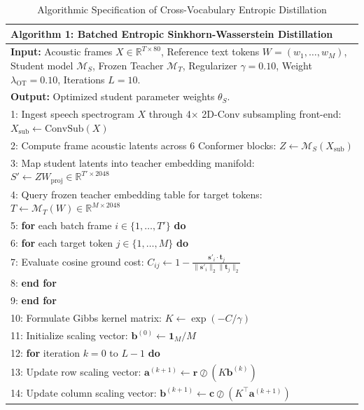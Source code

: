 \begin{table}[htbp]
\centering
\caption{Algorithmic Specification of Cross-Vocabulary Entropic Distillation}
\label{alg:sinkhorn_distill}
\begin{tabular}{p{14.5cm}}
\toprule
\textbf{Algorithm 1: Batched Entropic Sinkhorn-Wasserstein Distillation} \\
\midrule
\textbf{Input:} Acoustic frames $X \in \mathbb{R}^{T \times 80}$, Reference text tokens $W = (w_1, \dots, w_M)$, Student model $\mathcal{M}_S$, Frozen Teacher $\mathcal{M}_T$, Regularizer $\gamma = 0.10$, Weight $\lambda_{\text{OT}} = 0.10$, Iterations $L = 10$. \\
\textbf{Output:} Optimized student parameter weights $\theta_S$. \\
\midrule
1: Ingest speech spectrogram $X$ through 4$\times$ 2D-Conv subsampling front-end: $X_{\text{sub}} \leftarrow \text{ConvSub}(X)$ \\
2: Compute frame acoustic latents across 6 Conformer blocks: $Z \leftarrow \mathcal{M}_S(X_{\text{sub}})$ \\
3: Map student latents into teacher embedding manifold: $S' \leftarrow Z W_{\text{proj}} \in \mathbb{R}^{T' \times 2048}$ \\
4: Query frozen teacher embedding table for target tokens: $T \leftarrow \mathcal{M}_T(W) \in \mathbb{R}^{M \times 2048}$ \\
5: \textbf{for} each batch frame $i \in \{1, \dots, T'\}$ \textbf{do} \\
6: \quad \textbf{for} each target token $j \in \{1, \dots, M\}$ \textbf{do} \\
7: \qquad Evaluate cosine ground cost: $C_{ij} \leftarrow 1 - \frac{\mathbf{s}'_i \cdot \mathbf{t}_j}{\|\mathbf{s}'_i\|_2 \|\mathbf{t}_j\|_2}$ \\
8: \quad \textbf{end for} \\
9: \textbf{end for} \\
10: Formulate Gibbs kernel matrix: $K \leftarrow \exp(-C / \gamma)$ \\
11: Initialize scaling vector: $\mathbf{b}^{(0)} \leftarrow \mathbf{1}_M / M$ \\
12: \textbf{for} iteration $k = 0$ to $L - 1$ \textbf{do} \\
13: \quad Update row scaling vector: $\mathbf{a}^{(k+1)} \leftarrow \mathbf{r} \oslash (K \mathbf{b}^{(k)})$ \\
14: \quad Update column scaling vector: $\mathbf{b}^{(k+1)} \leftarrow \mathbf{c} \oslash (K^\top \mathbf{a}^{(k+1)})$ \\

\end{tabular}
\end{table}
